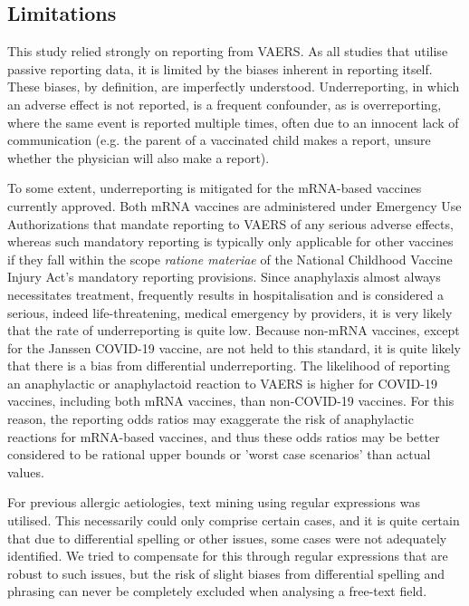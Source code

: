 \documentclass{article}
\begin{document}
\subsection{Limitations}

This study relied strongly on reporting from VAERS.
As all studies that utilise passive reporting data, it is limited by the biases inherent in reporting itself.
These biases, by definition, are imperfectly understood.\cite{singleton1999overview,shimabukuro2015safety,chen1994vaccine}
Underreporting, in which an adverse effect is not reported, is a frequent confounder, as is overreporting, where the same event is reported multiple times, often due to an innocent lack of communication (e.g. the parent of a vaccinated child makes a report, unsure whether the physician will also make a report).

To some extent, underreporting is mitigated for the mRNA-based vaccines currently approved.
Both mRNA vaccines are administered under Emergency Use Authorizations that mandate reporting to VAERS of any serious adverse effects, whereas such mandatory reporting is typically only applicable for other vaccines if they fall within the scope \textit{ratione materiae} of the National Childhood Vaccine Injury Act's mandatory reporting provisions.
Since anaphylaxis almost always necessitates treatment, frequently results in hospitalisation and is considered a serious, indeed life-threatening, medical emergency by providers, it is very likely that the rate of underreporting is quite low.
Because non-mRNA vaccines, except for the Janssen COVID-19 vaccine, are not held to this standard, it is quite likely that there is a bias from differential underreporting.
The likelihood of reporting an anaphylactic or anaphylactoid reaction to VAERS is higher for COVID-19 vaccines, including both mRNA vaccines, than non-COVID-19 vaccines.
For this reason, the reporting odds ratios may exaggerate the risk of anaphylactic reactions for mRNA-based vaccines, and thus these odds ratios may be better considered to be rational upper bounds or 'worst case scenarios' than actual values.

For previous allergic aetiologies, text mining using regular expressions was utilised.
This necessarily could only comprise certain cases, and it is quite certain that due to differential spelling or other issues, some cases were not adequately identified.
We tried to compensate for this through regular expressions that are robust to such issues, but the risk of slight biases from differential spelling and phrasing can never be completely excluded when analysing a free-text field.
\end{document}
